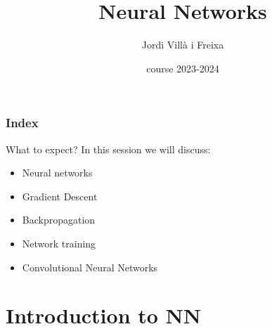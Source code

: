\documentclass{beamer}
\title[Neural Networks]{Neural Networks} %
\author{Jordi Villà i Freixa} %
\institute[FCTE] %
{
Universitat de Vic - Universitat Central de Catalunya \\
Study Abroad\\ %
\medskip
\textit{jordi.villa@uvic.cat} %
}
\date{course 2023-2024}
\begin{document}
\begin{frame}
\titlepage %
\end{frame}

\begin{frame}
\frametitle{Index} %
\tableofcontents %
\end{frame}



\begin{frame}{What to expect?}
  In this session we will discuss:
  \begin{itemize}
    \item Neural networks
    \item Gradient Descent
    \item Backpropagation
    \item Network training
    \item Convolutional Neural Networks
  \end{itemize}
\end{frame}

\section{Introduction to NN}
\end{document}

